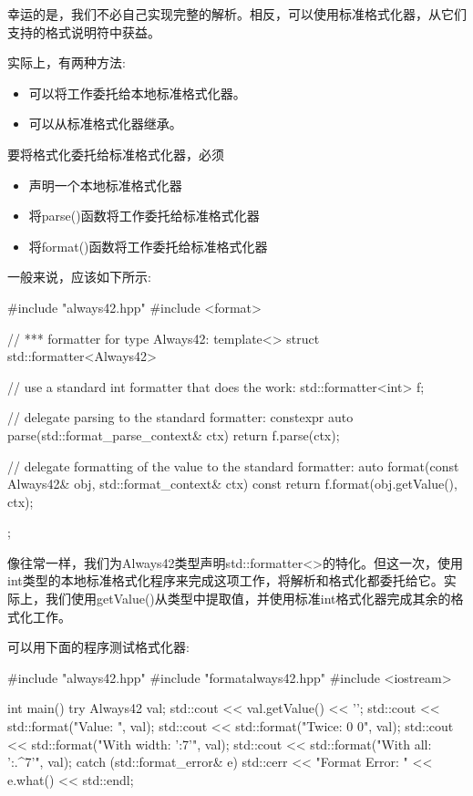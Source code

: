 幸运的是，我们不必自己实现完整的解析。相反，可以使用标准格式化器，从它们支持的格式说明符中获益。

实际上，有两种方法:

\begin{itemize}
\item
可以将工作委托给本地标准格式化器。

\item
可以从标准格式化器继承。
\end{itemize}


要将格式化委托给标准格式化器，必须

\begin{itemize}
\item
声明一个本地标准格式化器

\item
将parse()函数将工作委托给标准格式化器

\item
将format()函数将工作委托给标准格式化器
\end{itemize}

一般来说，应该如下所示:


\begin{cpp}
#include "always42.hpp"
#include <format>

// *** formatter for type Always42:
template<>
struct std::formatter<Always42>
{
	// use a standard int formatter that does the work:
	std::formatter<int> f;
	
	// delegate parsing to the standard formatter:
	constexpr auto parse(std::format_parse_context& ctx) {
		return f.parse(ctx);
	}
	
	// delegate formatting of the value to the standard formatter:
	auto format(const Always42& obj, std::format_context& ctx) const {
		return f.format(obj.getValue(), ctx);
	}
};
\end{cpp}

像往常一样，我们为Always42类型声明std::formatter<>的特化。但这一次，使用int类型的本地标准格式化程序来完成这项工作，将解析和格式化都委托给它。实际上，我们使用getValue()从类型中提取值，并使用标准int格式化器完成其余的格式化工作。

可以用下面的程序测试格式化器:


\begin{cpp}
#include "always42.hpp"
#include "formatalways42.hpp"
#include <iostream>

int main()
{
	try {
		Always42 val;
		std::cout << val.getValue() << '\n';
		std::cout << std::format("Value: {}\n", val);
		std::cout << std::format("Twice: {0} {0}\n", val);
		std::cout << std::format("With width: '{:7}'\n", val);
		std::cout << std::format("With all: '{:.^7}'\n", val);
	}
	catch (std::format_error& e) {
		std::cerr << "Format Error: " << e.what() << std::endl;
	}
}
\end{cpp}

